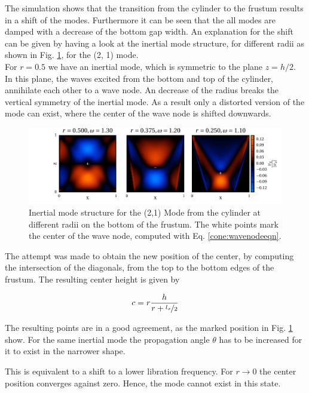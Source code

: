 The simulation shows that the transition from the cylinder
to the frustum results in a shift of the modes.
Furthermore it can be seen that the all modes are damped with a decrease of the bottom gap width.
An explanation for the shift can be given by having a look at the inertial mode structure,
for different radii as shown in Fig. \ref{fig:cone:phase}, for the (2, 1) mode.\\
For $r=0.5$ we have an inertial mode, which is symmetric to the plane $z=h/2$.
In this plane, the waves excited from the bottom and top of the cylinder, annihilate each other to a wave node.
An decrease of the radius breaks the vertical symmetry of the inertial mode.
As a result only a distorted version of the mode can exist, where the center of the wave node
is shifted downwards.

\begin{figure}[!b]
  \centering
  \includegraphics{gfx/cone/transition/phase.pdf}
  \caption{\label{fig:cone:phase}
    Inertial mode structure for the (2,1) Mode from the cylinder at different radii on the bottom of the frustum.
    The white points mark the center of the wave node, computed with Eq.  \ref{cone:wavenodeeqn}.
  }
\end{figure}

The attempt was made to obtain the new position of the center,
by computing the intersection of the diagonals, from the top to the bottom edges of the frustum.
The resulting center height is given by

\begin{align}
\label{cone:wavenodeeqn}
c  = r \frac{h}{r+\nicefrac{l_x}{2}}
\end{align}

The resulting points are in a good agreement, as the marked position in Fig. \ref{fig:cone:phase} show.
For the same inertial mode the propagation angle $\theta$ has to be
increased for it to exist in the narrower shape.

This is equivalent to a shift to a lower libration frequency.
For $r \rightarrow 0$ the center position converges against zero. Hence, the mode cannot exist in this state.

